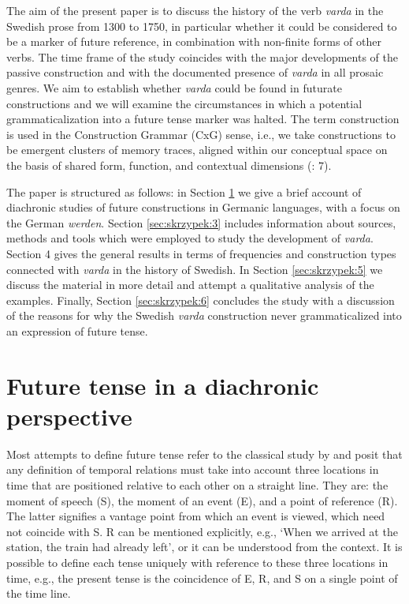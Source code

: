 \documentclass[output=paper,colorlinks,citecolor=brown]{langscibook}
\begin{document}
The aim of the present paper is to discuss the history of the verb \textit{varda} in the Swedish prose from 1300 to 1750, in particular whether it could be considered to be a marker of future reference, in combination with non-finite forms of other verbs. The time frame of the study coincides with the major developments of the passive construction and with the documented presence of \textit{varda} in all prosaic genres. We aim to establish whether \textit{varda} could be found in futurate constructions and we will examine the circumstances in which a potential grammaticalization into a future tense marker was halted. The term construction is used in the Construction Grammar (CxG) sense, i.e., we take constructions to be emergent clusters of memory traces, aligned within our conceptual space on the basis of shared form, function, and contextual dimensions (\cite{Goldberg2019}: 7).

The paper is structured as follows: in Section \ref{sec:skrzypek:2} we give a brief account of diachronic studies of future constructions in Germanic languages, with a focus on the German \textit{werden}. Section \ref{sec:skrzypek:3} includes information about sources, methods and tools which were employed to study the development of \textit{varda}. Section 4 gives the general results in terms of frequencies and construction types connected with \textit{varda} in the history of Swedish. In Section \ref{sec:skrzypek:5} we discuss the material in more detail and attempt a qualitative analysis of the examples. Finally, Section \ref{sec:skrzypek:6} concludes the study with a discussion of the reasons for why the Swedish \textit{varda} construction never grammaticalized into an expression of future tense. 

\section{Future tense in a diachronic perspective} \label{sec:skrzypek:2}
Most attempts to define future tense refer to the classical study by \citet[287--298]{Reichenbach1947} and posit that any definition of temporal relations must take into account three locations in time that are positioned relative to each other on a straight line. They are: the moment of speech (S), the moment of an event (E), and a point of reference (R). The latter signifies a vantage point from which an event is viewed, which need not coincide with S. R can be mentioned explicitly, e.g., ‘When we arrived at the station, the train had already left’, or it can be understood from the context. It is possible to define each tense uniquely with reference to these three locations in time, e.g., the present tense is the coincidence of E, R, and S on a single point of the time line.
\end{document}
